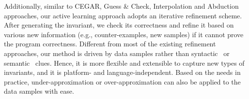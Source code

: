 Additionally, similar to CEGAR, Guess \& Check, Interpolation and Abduction approaches, 
our active learning approach adopts an iterative refinement scheme. 
After generating the invariant, we check its correctness and refine it 
based on various new information (e.g., counter-examples, new samples) 
if it cannot prove the program correctness. 
Different from most of the existing refinement approaches, 
our method is driven by data samples 
rather than syntactic~\cite{cormac2001houdini} or semantic~\cite{ashutosh2009invgen,isil2013inductive} clues. 
Hence, it is more flexible and extensible to capture new types of invariants, 
and it is platform- and language-independent. 
Based on the needs in practice, under-approximation or over-approximation 
can also be applied to the data samples with ease. 

